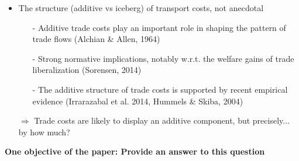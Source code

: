 \documentclass[10 pt,Helvetica, french]{beamer}
\begin{document}
\begin{frame}
\begin{itemize}
\item The structure (additive vs iceberg) of transport costs, not anecdotal \vspace{0.2cm}
\begin{itemize}
\item[-] Additive trade costs play an important role in shaping the pattern of trade flows (Alchian \& Allen, 1964) \vspace{0.1cm}
\item[-] Strong normative implications, notably w.r.t. the welfare gains of trade liberalization (Sorensen, 2014)\vspace{0.1cm}
\item[-] The additive structure of trade costs is supported by recent empirical evidence (Irrarazabal et al. 2014, Hummels \& Skiba, 2004)  \vspace{0.1cm}
\end{itemize}
\item[$\Rightarrow$] Trade costs are likely to display an additive component, but precisely... by how much? \vspace{0.2cm}
\end{itemize}
\textbf{One objective of the paper: Provide an answer to this question}

\end{frame}
\end{document}

